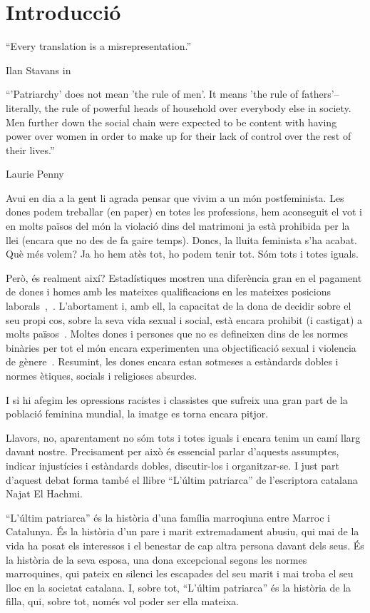 \section{Introducció}

\epigraph{``Every translation is a misrepresentation.''}{Ilan Stavans in~\autocite{Albin2005}}
\epigraph{``'Patriarchy' does not mean 'the rule of men'. It means 'the rule of fathers'--literally, the rule of powerful heads of household over everybody else in society. Men further down the social chain were expected to be content with having power over women in order to make up for their lack of control over the rest of their lives.''}{Laurie Penny~\autocite[69]{Penny2014}}

Avui en dia a la gent li agrada pensar que vivim a un món postfeminista.
Les dones podem treballar (en paper) en totes les professions, hem aconseguit el vot i en molts països del món la violació dins del matrimoni ja està prohibida per la llei (encara que no des de fa gaire temps).
Doncs, la lluita feminista s'ha acabat.
Què més volem?
Ja ho hem atès tot, ho podem tenir tot.
Sóm tots i totes iguals.

Però, és realment així?
Estadístiques mostren una diferència gran en el pagament de dones i homes amb les mateixes qualificacions en les mateixes posicions laborals~\autocite{EU2014},~\autocite{MDBGH2012}.
L'abortament i, amb ell, la capacitat de la dona de decidir sobre el seu propi cos, sobre la seva vida sexual i social, està encara prohibit (i castigat) a molts països~\autocite{UN2013}.
Moltes dones i persones que no es defineixen dins de les normes binàries per tot el món encara experimenten una objectificació sexual i violencia de gènere~\autocite{WHO2016}.
Resumint, les dones encara estan sotmeses a estàndards dobles i normes ètiques, socials i religioses absurdes.

I si hi afegim les opressions racistes i classistes que sufreix una gran part de la població feminina mundial, la imatge es torna encara pitjor.

Llavors, no, aparentament no sóm tots i totes iguals i encara tenim un camí llarg davant nostre.
Precisament per això és essencial parlar d'aquests assumptes, indicar injustícies i estàndards dobles, discutir-los i organitzar-se.
I just part d'aquest debat forma també el llibre ``L'últim patriarca'' de l'escriptora catalana Najat El Hachmi.

``L'últim patriarca'' és la història d'una família marroqiuna entre Marroc i Catalunya.
És la història d'un pare i marit extremadament abusiu, qui mai de la vida ha posat els interessos i el benestar de cap altra persona davant dels seus.
És la història de la seva esposa, una dona excepcional segons les normes marroquines, qui pateix en silenci les escapades del seu marit i mai troba el seu lloc en la societat catalana.
I, sobre tot, ``L'últim patriarca'' és la història de la filla, qui, sobre tot, només vol poder ser ella mateixa.

